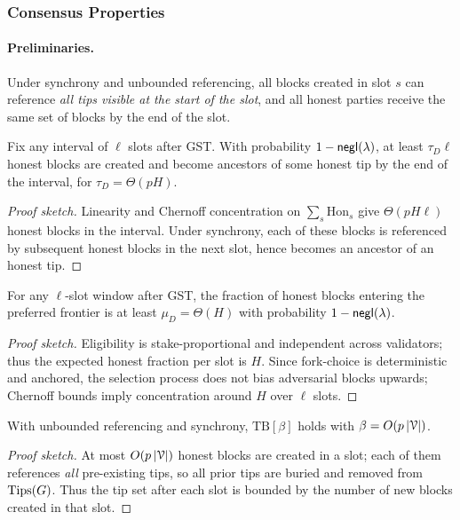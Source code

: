 \subsubsection{Consensus Properties}

\paragraph{Preliminaries.} %
Under synchrony and unbounded referencing, all blocks created in slot $s$ can reference \emph{all tips visible at the start of the slot}, and all honest parties receive the same set of blocks by the end of the slot.

\begin{theorem}
\label{thm:ideal-DG}
Fix any interval of $\ell$ slots after GST. With probability $1-\mathsf{negl}(\lambda)$, at least $\tau_D\ell$ honest blocks are created and become ancestors of some honest tip by the end of the interval, for $\tau_D=\Theta(pH)$.
\end{theorem}
\begin{proof}[Proof sketch]
Linearity and Chernoff concentration on $\sum_{s} \mathrm{Hon}_s$ give $\Theta(pH\ell)$ honest blocks in the interval. Under synchrony, each of these blocks is referenced by subsequent honest blocks in the next slot, hence becomes an ancestor of an honest tip. 
\end{proof}

\begin{theorem}
\label{thm:ideal-DQ}
For any $\ell$-slot window after GST, the fraction of honest blocks entering the preferred frontier is at least $\mu_D=\Theta(H)$ with probability $1-\mathsf{negl}(\lambda)$.
\end{theorem}
\begin{proof}[Proof sketch]
Eligibility is stake-proportional and independent across validators; thus the expected honest fraction per slot is $H$. Since fork-choice is deterministic and anchored, the selection process does not bias adversarial blocks upwards; Chernoff bounds imply concentration around $H$ over $\ell$ slots.
\end{proof}

\begin{theorem}
\label{thm:ideal-TB}
With unbounded referencing and synchrony, $\mathrm{TB}[\beta]$ holds with $\beta=O(p\,|\mathcal{V}|)$.
\end{theorem}
\begin{proof}[Proof sketch]
At most $O(p\,|\mathcal{V}|)$ honest blocks are created in a slot; each of them references \emph{all} pre-existing tips, so all prior tips are buried and removed from $\mathrm{Tips}(G)$. Thus the tip set after each slot is bounded by the number of new blocks created in that slot.
\end{proof}

